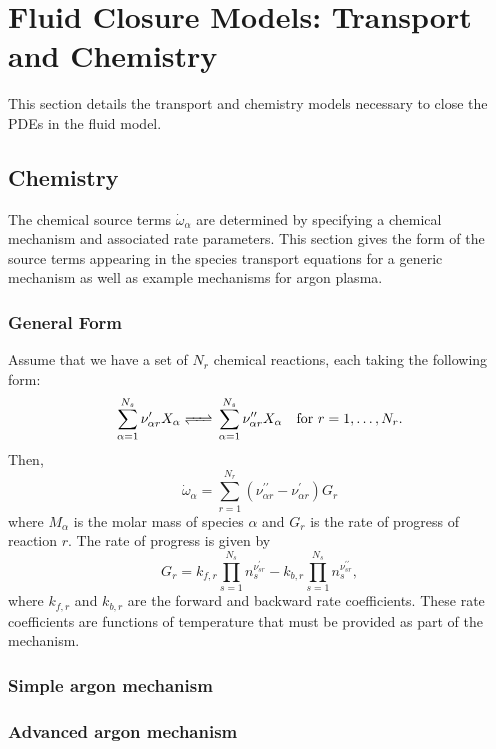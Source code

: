 \section{Fluid Closure Models: Transport and Chemistry} \label{sec:fluid-closures}
This section details the transport and chemistry models necessary to
close the PDEs in the fluid model.

\subsection{Chemistry}
The chemical source terms $\dot{\omega}_{\alpha}$ are determined by
specifying a chemical mechanism and associated rate parameters.  This
section gives the form of the source terms appearing in the species
transport equations for a generic mechanism as well as example
mechanisms for argon plasma.

\subsubsection{General Form}
Assume that we have a set of $N_r$ chemical reactions, each taking the
following form:
%
\begin{equation*}
\sum_{\alpha=1}^{N_s} \nu^{\prime}_{\alpha r} X_{\alpha}
\ce{<=>}
\sum_{\alpha=1}^{N_s} \nu^{\prime\prime}_{\alpha r} X_{\alpha}
\quad
\textrm{for} \,\, r = 1, \ldots, N_r.
\end{equation*}
%
Then,
%
\begin{equation*}
\dot{\omega}_{\alpha}
=
\sum_{r=1}^{N_r} (\nu^{\prime \prime}_{\alpha r} - \nu^{\prime}_{\alpha r}) G_r
\end{equation*}
%
where $M_{\alpha}$ is the molar mass of species $\alpha$ and $G_r$ is
the rate of progress of reaction $r$.  The rate of progress is given
by
%
\begin{equation*}
G_r
=
k_{f,r} \prod_{s=1}^{N_s} n_s^{\nu^{\prime}_{sr}}
-
k_{b,r} \prod_{s=1}^{N_s} n_s^{\nu^{\prime \prime}_{sr}},
\end{equation*}
%
where $k_{f,r}$ and $k_{b,r}$ are the forward and backward rate
coefficients.  These rate coefficients are functions of temperature
that must be provided as part of the mechanism.

\subsubsection{Simple argon mechanism}

\subsubsection{Advanced argon mechanism}


